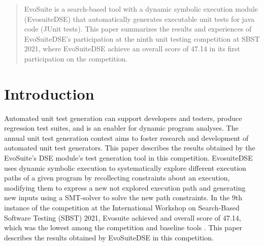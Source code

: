 \documentclass[conference]{IEEEtran}
\begin{document}
\maketitle

\begin{abstract}
EvoSuite is a search-based tool with a dynamic symbolic execution module (EvosuiteDSE) that automatically generates executable unit tests for java code (JUnit tests). This paper summarizes the results and experiences of EvoSuiteDSE's participation at the ninth unit testing competition at SBST 2021, where EvoSuiteDSE achieve an overall score of 47.14 in its first participation on the competition.
\end{abstract}





%
\IEEEpeerreviewmaketitle



\section{Introduction}

 

Automated unit test generation can support developers and testers, produce regression test suites, and is an enabler for dynamic program analyses. The annual unit test generation contest aims to foster research and development of automated unit test generators. 
This paper describes the results obtained by the EvoSuite's DSE module's \cite{TesisIgnacio} test generation tool in this competition. 
EvosuiteDSE uses dynamic symbolic execution to systematically explore different execution paths of a given program by recollecting constraints about an execution, modifying them to express a new not explored execution path and generating new inputs using a SMT-solver to solve the new path constraints. In the 9th instance of the competition at the International Workshop on Search-Based Software Testing (SBST) 2021, Evosuite achieved and overall score of 47.14, which was the lowest among the competition and baseline tools \cite{SBST2021}. This paper describes the results obtained by EvoSuiteDSE in this competition.
\end{document}
